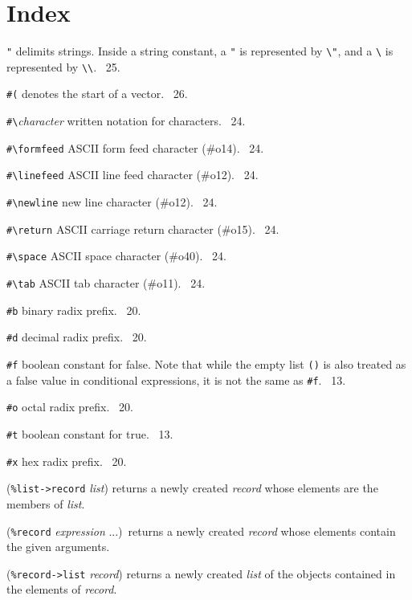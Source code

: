 \documentclass[10pt,twocolumn]{article}
\begin{document}
\section*{Index}

\texttt{"} delimits strings.  Inside a string constant, a \texttt{"}
is represented by \texttt{\textbackslash"}, and a
\texttt{\textbackslash} is represented by
\texttt{\textbackslash\textbackslash}.  \RRRRRS~25.

\texttt{\#(} denotes the start of a vector.  \RRRRRS~26.

\texttt{\#\textbackslash}\emph{character} written notation for
characters.  \RRRRRS~24.

\texttt{\#\textbackslash{}formfeed} ASCII form feed character (\#o14).
\RRRRRS~24.

\texttt{\#\textbackslash{}linefeed} ASCII line feed character (\#o12).
\RRRRRS~24.

\texttt{\#\textbackslash{}newline} new line character (\#o12).
\RRRRRS~24.

\texttt{\#\textbackslash{}return} ASCII carriage return character
(\#o15).  \RRRRRS~24.

\texttt{\#\textbackslash{}space} ASCII space character (\#o40).
\RRRRRS~24.

\texttt{\#\textbackslash{}tab} ASCII tab character (\#o11).
\RRRRRS~24.

\texttt{\#b} binary radix prefix.  \RRRRRS~20.

\texttt{\#d} decimal radix prefix.  \RRRRRS~20.

\texttt{\#f} boolean constant for false.  Note that while the empty
list \texttt{()} is also treated as a false value in conditional
expressions, it is not the same as \texttt{\#f}.  \RRRRRS~13.

\texttt{\#o} octal radix prefix.  \RRRRRS~20.

\texttt{\#t} boolean constant for true.  \RRRRRS~13.

\texttt{\#x} hex radix prefix.  \RRRRRS~20.

(\texttt{\%list->record} \emph{list}) returns a newly created
\emph{record} whose elements are the members of \emph{list}.

(\texttt{\%record} \emph{expression} ...)\ returns a newly created
\emph{record} whose elements contain the given arguments.

(\texttt{\%record->list} \emph{record}) returns a newly created
\emph{list} of the objects contained in the elements of \emph{record}.
\end{document}
